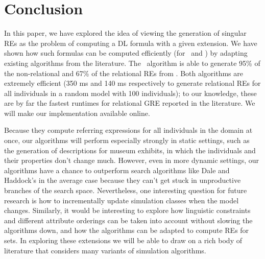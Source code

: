 \section{Conclusion} \label{sec:conclusion}

In this paper, we have explored the idea of viewing the generation of
singular REs as the problem of computing a DL formula with a given
extension.  We have shown how such formulas can be computed
efficiently (for \alc\ and \el) by adapting existing algorithms from
the literature.  The \el\ algorithm is able to generate 95\% of the
non-relational and 67\% of the relational REs from
.  Both algorithms
are extremely efficient (350 ms and 140 ms respectively to generate
relational REs for all individuals in a random model with 100
individuals); to our knowledge, these are by far the fastest runtimes
for relational GRE reported in the literature.  We will make our
implementation available online.

Because they compute referring expressions for all individuals in the
domain at once, our algorithms will perform especially strongly in
static settings, such as the generation of descriptions for museum
exhibits, in which the individuals and their properties don't change
much.  However, even in more dynamic settings, our algorithms have a
chance to outperform search algorithms like Dale and Haddock's in the
average case because they can't get stuck in unproductive branches of
the search space. Nevertheless, one interesting question for future
research is how to incrementally update simulation classes when the
model changes. Similarly, it would be interesting to explore how
linguistic constraints and different attribute orderings can be taken
into account without slowing the algorithms down, and how the
algorithms can be adapted to compute REs for sets. In exploring these
extensions we will be able to draw on a rich body of literature that
considers many variants of simulation algorithms.









